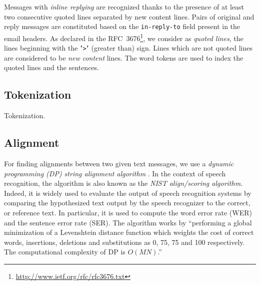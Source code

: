 
Messages with \textit{inline replying} are recognized thanks to the presence of at least two consecutive quoted lines separated by new content lines.
% 
Pairs of original and reply messages are constituted based on the \texttt{\footnotesize in-reply-to} field present in the email headers.
% 
As declared in the RFC~3676\footnote{\url{http://www.ietf.org/rfc/rfc3676.txt}}, we consider as \textit{quoted lines}, the lines beginning with the "\texttt{>}" (greater than) sign.
% 
Lines which are not quoted lines are considered to be \textit{new content} lines.
% 
The word tokens are used to index the quoted lines and the sentences. 

\subsection{Tokenization}

Tokenization.

\subsection{Alignment}

For finding alignments between two given text messages, we use a \textit{dynamic programming (DP) string alignment algorithm} \cite{sankoff:1983}.
% 
In the context of speech recognition, the algorithm is also known as the \textit{NIST align/scoring algorithm}. Indeed, it is widely used to evaluate the output of speech recognition systems by comparing the hypothesized text output by the speech recognizer to the correct, or reference text. 
% 
In particular, it is used to compute the word error rate (WER) and the sentence error rate (SER).
% 
The algorithm works by ``performing a global minimization of a Levenshtein distance function which weights the cost of correct words, insertions, deletions and substitutions as 0, 75, 75 and 100 respectively. The computational complexity of DP is $O(MN)$.''

